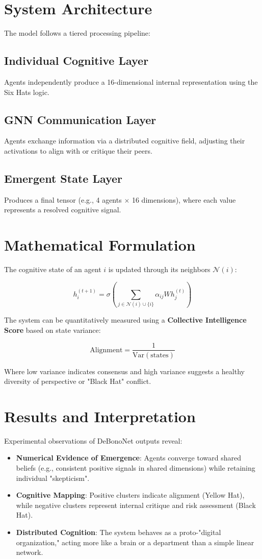 \documentclass[12pt]{article}
\begin{document}
\section{System Architecture}

The model follows a tiered processing pipeline:

\subsection{Individual Cognitive Layer}
Agents independently produce a 16-dimensional internal representation using the Six Hats logic.

\subsection{GNN Communication Layer}
Agents exchange information via a distributed cognitive field, adjusting their activations to align with or critique their peers.

\subsection{Emergent State Layer}
Produces a final tensor (e.g., 4 agents $\times$ 16 dimensions), where each value represents a resolved cognitive signal.

\section{Mathematical Formulation}

The cognitive state of an agent $i$ is updated through its neighbors $\mathcal{N}(i)$:

\[
h_i^{(t+1)} = \sigma \left( \sum_{j \in \mathcal{N}(i) \cup \{i\}} \alpha_{ij} W h_j^{(t)} \right)
\]

The system can be quantitatively measured using a \textbf{Collective Intelligence Score} based on state variance:

\[
\text{Alignment} = \frac{1}{\text{Var}(\text{states})}
\]

Where low variance indicates consensus and high variance suggests a healthy diversity of perspective or "Black Hat" conflict.

\section{Results and Interpretation}

Experimental observations of DeBonoNet outputs reveal:
\begin{itemize}
\item \textbf{Numerical Evidence of Emergence}: Agents converge toward shared beliefs (e.g., consistent positive signals in shared dimensions) while retaining individual "skepticism".
\item \textbf{Cognitive Mapping}: Positive clusters indicate alignment (Yellow Hat), while negative clusters represent internal critique and risk assessment (Black Hat).
\item \textbf{Distributed Cognition}: The system behaves as a proto-"digital organization," acting more like a brain or a department than a simple linear network.
\end{itemize}
\end{document}
